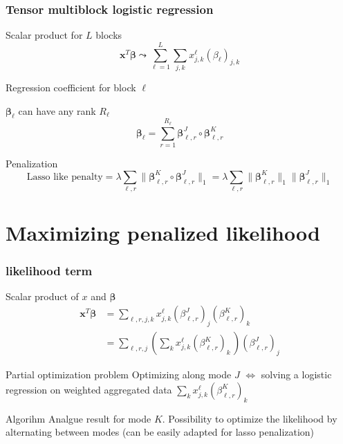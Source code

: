 \documentclass{beamer}
\begin{document}
\begin{frame}
    \frametitle{Tensor multiblock logistic regression}
    \begin{block}{Scalar product for $L$ blocks}
        $$\mathbf{x}^T\bm{\beta} \leadsto   \sum\limits_{\ell = 1}^L \sum\limits_{j,k} x_{j,k}^\ell(\beta_\ell)_{j,k}$$
       \end{block}

    \begin{block}{Regression coefficient for block $\ell$}
    
    $\bm{\beta}_\ell$ can have any rank $R_\ell$
    $$\bm{\beta}_\ell = \sum\limits_{r = 1}^{R_\ell} \bm{\beta}_{\ell,r}^J \circ \bm{\beta}_{\ell,r}^K $$
    \end{block}
    \begin{block}{Penalization}
        $$\text{Lasso like penalty} = \lambda \sum\limits_{\ell,r}\lVert \bm{\beta}_{\ell,r}^K \circ \bm{\beta}_{\ell,r}^J \rVert_1 = \lambda \sum\limits_{\ell,r}  \lVert \bm{\beta}_{\ell,r}^K \rVert_1 \lVert \bm{\beta}_{\ell,r}^J \rVert_1 $$
    \end{block}
\end{frame}

\section{Maximizing penalized likelihood}
\begin{frame}
\sectionpage
\end{frame}

\begin{frame}
\frametitle{likelihood term}
\begin{block}{Scalar product of $x$ and $\bm{\beta}$}
\begin{align}
\mathbf{x}^T\bm{\beta} &= \sum\limits_{\ell,r,j,k} x_{j,k}^\ell(\beta_{\ell,r}^J)_j(\beta_{\ell,r}^K)_k\\[-5 pt]
&= \sum\limits_{\ell,r,j} \left(\sum\limits_{k}  x_{j,k}^\ell(\beta_{\ell,r}^{K})_k \, \right)(\beta_{\ell,r}^{J})_j
\end{align}
\end{block}

\begin{block}{Partial optimization problem}
 Optimizing along mode $J$ $\Leftrightarrow$ solving a logistic regression on weighted aggregated data $\sum\limits_{k}  x_{j,k}^\ell(\beta_{\ell,r}^{K})_k $
\end{block}
\begin{block}{Algorihm}
Analgue result for mode $K$. Possibility to optimize the likelihood by alternating between modes (can be easily adapted for lasso penalization)
\end{block}

\end{frame}
\end{document}
